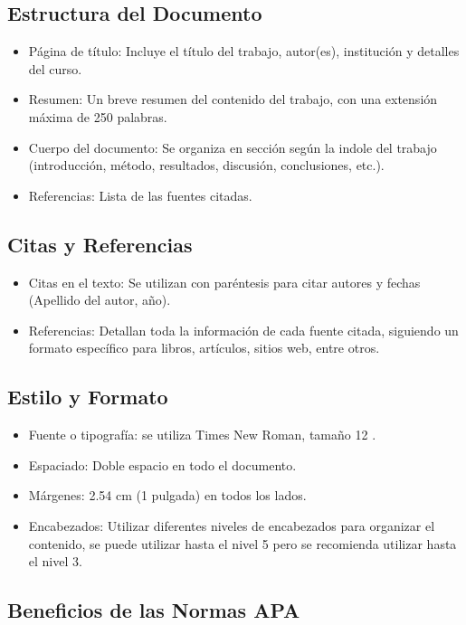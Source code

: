 \documentclass[12pt]{article}
\begin{document}
\subsection*{Estructura del Documento}
\begin{itemize}
\item Página de título: Incluye el título del trabajo, autor(es), institución y detalles del curso.
\item Resumen:  Un breve resumen del contenido del trabajo, con una extensión máxima de 250 palabras.
\item Cuerpo del documento: Se organiza en sección según la indole del trabajo (introducción, método, resultados, discusión, conclusiones, etc.).
\item Referencias: Lista de las fuentes citadas.
\end{itemize}

\subsection*{Citas y Referencias}
\begin{itemize}
\item Citas en el texto: Se utilizan con paréntesis para citar autores y fechas (Apellido del autor, año).
\item Referencias: Detallan toda la información de cada fuente citada, siguiendo un formato específico para libros, artículos, sitios web, entre otros.
\end{itemize}

\subsection*{Estilo y Formato}
\begin{itemize}
\item  Fuente o tipografía: se utiliza Times New Roman, tamaño 12 .
\item Espaciado: Doble espacio en todo el documento.
\item Márgenes: 2.54 cm (1 pulgada) en todos los lados.
\item Encabezados: Utilizar diferentes niveles de encabezados para organizar el contenido, se puede utilizar hasta el nivel 5 pero se recomienda utilizar hasta el nivel 3.
\end{itemize}

\subsection*{Beneficios de las Normas APA }
\end{document}
